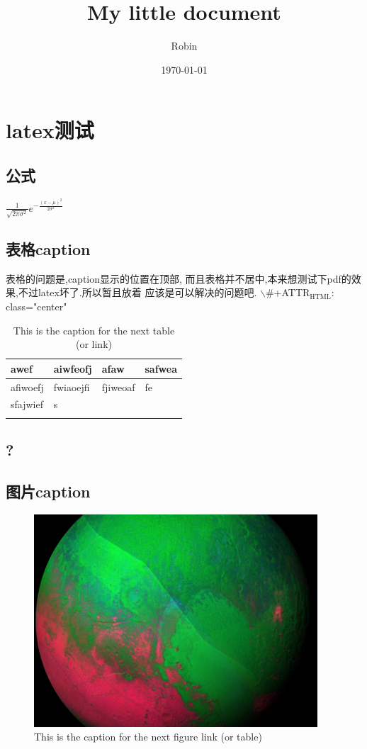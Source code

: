 \documentclass[nofonts]{ctexart}
\author{Robin}
\date{\today}
\title{My little document}
\begin{document}
\maketitle
\tableofcontents

\section{latex测试}
\label{sec:orgheadline10}
\subsection{公式}
\label{sec:orgheadline1}
\(\frac{1}{\sqrt{2\pi\sigma^2}}e^{ -\frac{(x-\mu)^2}{2\sigma^2} }\)
\subsection{表格caption}
\label{sec:orgheadline2}
    表格的问题是,caption显示的位置在顶部,
    而且表格并不居中,本来想测试下pdf的效果,不过latex坏了.所以暂且放着
应该是可以解决的问题吧.
$\backslash$#+ATTR\(_{\text{HTML}}\): class="center"

\begin{table}[htb]
\caption{\label{tab:orgtable1}
This is the caption for the next table (or link)}
\centering
\begin{tabular}{llll}
awef & aiwfeofj & afaw & safwea\\
\hline
afiwoefj & fwiaoejfi & fjiweoaf & fe\\
sfajwief & s &  & \\
 &  &  & \\
\end{tabular}
\end{table}

\subsection{?}
\label{sec:orgheadline3}
\subsection{图片caption}
\label{sec:orgheadline4}

\begin{figure}[htb]
\centering
\includegraphics[width=.9\linewidth]{img/1.jpg}
\caption{\label{fig:orgparagraph1}
This is the caption for the next figure link (or table)}
\end{figure}
\end{document}
